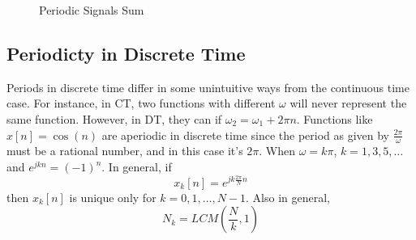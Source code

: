 \begin{figure}
    \centering
    \caption{Periodic Signals Sum}
\end{figure}

\subsection{Periodicty in Discrete Time}
Periods in discrete time differ in some 
unintuitive ways from the continuous time case. 
For instance, in CT, two functions with 
different $\omega$ will never represent 
the same function. However, in DT, they can 
if $\omega_2 = \omega_1 + 2\pi n$. Functions like 
$x[n] = \cos(n)$ are aperiodic in discrete time 
since the period as given by $\frac{2\pi}\omega$
must be a rational number, and in this case it's 
$2\pi$. When $\omega = k\pi$, $k = 1, 3, 5, \dots$ and 
$e^{jkn} = (-1)^n$. 
In general, if 
\begin{equation}
    x_k[n] = e^{jk \frac{2\pi}{N}n}
\end{equation}
then $x_k[n]$ is unique only for $k = 0, 1, \dots, N-1$. 
Also in general, 
\begin{equation}
    N_k = LCM(\frac{N}{k}, 1)
\end{equation}
